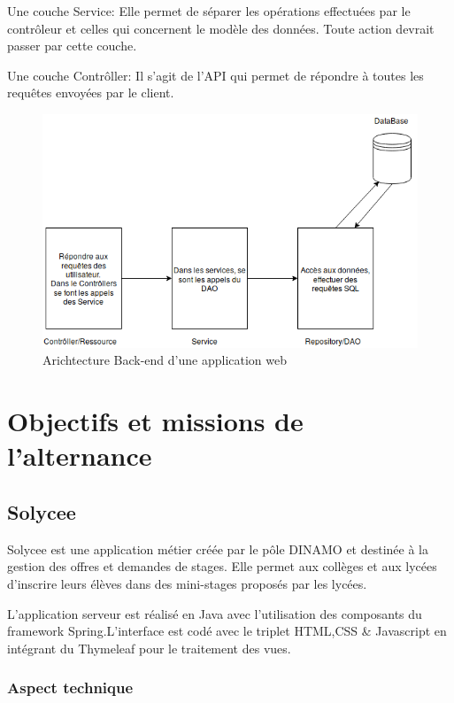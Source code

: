 \documentclass[12pt]{article}
\begin{document}
Une couche Service: Elle permet de séparer les opérations effectuées par le contrôleur et celles qui concernent le modèle des données. Toute action devrait passer par cette couche.\newline


Une couche Contrôller: Il s'agit de l'API qui permet de répondre à toutes les requêtes envoyées par le client. 

\begin{figure}[H]
	\centering
 		\includegraphics[width=1\textwidth]{diagrammes/ArchitectureProjet.png}
  		\caption{Arichtecture Back-end d'une application web}
	\end{figure}

\section{Objectifs et missions de l'alternance}

\subsection{Solycee}

Solycee est une application métier créée par le pôle DINAMO et destinée à la gestion des offres et demandes de stages. Elle permet aux collèges et aux lycées d'inscrire leurs élèves dans des mini-stages proposés par les lycées.  

L'application serveur est réalisé en Java avec l'utilisation des composants du framework Spring.L'interface est codé avec le triplet HTML,CSS \& Javascript en intégrant du Thymeleaf pour le traitement des vues.  

\subsubsection{Aspect technique}
\end{document}
